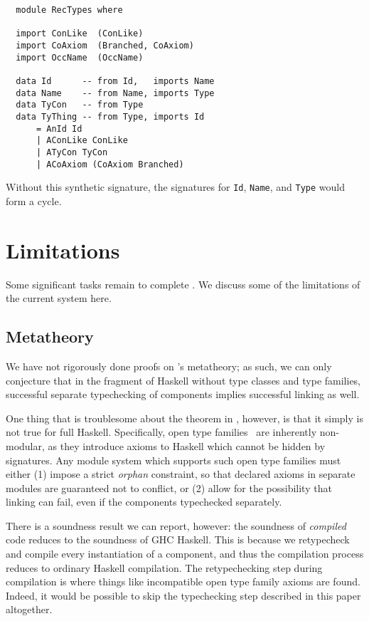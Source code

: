 \begin{verbatim}
  module RecTypes where

  import ConLike  (ConLike)
  import CoAxiom  (Branched, CoAxiom)
  import OccName  (OccName)

  data Id      -- from Id,   imports Name
  data Name    -- from Name, imports Type
  data TyCon   -- from Type
  data TyThing -- from Type, imports Id
      = AnId Id
      | AConLike ConLike
      | ATyCon TyCon
      | ACoAxiom (CoAxiom Branched)
\end{verbatim}
Without this synthetic signature, the signatures for \texttt{Id}, \texttt{Name},
and \texttt{Type} would form a cycle.

\section{Limitations}
\label{sec:limitations}

Some significant tasks remain to complete \Backpack{}.  We discuss
some of the limitations of the current system here.

\subsection{Metatheory}
\label{sec:metatheory}

We have not rigorously done proofs on \Backpack{}'s metatheory; as such, we can
only conjecture that in the fragment of Haskell without type classes
and type families, successful separate typechecking of components
implies successful linking as well.

One thing that is troublesome about the theorem in \OldBackpack{}, however,
is that it simply is not true for full Haskell.  Specifically,
open type families~\cite{schrijvers+:typefamilies} are inherently non-modular, as they
introduce axioms to Haskell which cannot be hidden by signatures.
Any module system which supports such open type families must either
(1) impose a strict \emph{orphan} constraint, so that declared axioms
in separate modules are guaranteed not to conflict, or (2) allow
for the possibility that linking can fail, even if the components
typechecked separately.

There is a soundness result we can report, however: the soundness of
\emph{compiled} \Backpack{} code reduces to the soundness of GHC
Haskell.  This is because we retypecheck and compile every instantiation
of a component, and thus the compilation process reduces to ordinary
Haskell compilation.  The retypechecking step during compilation is
where things like incompatible open type family axioms are found.
Indeed, it would be possible to skip the typechecking step described in
this paper altogether.


